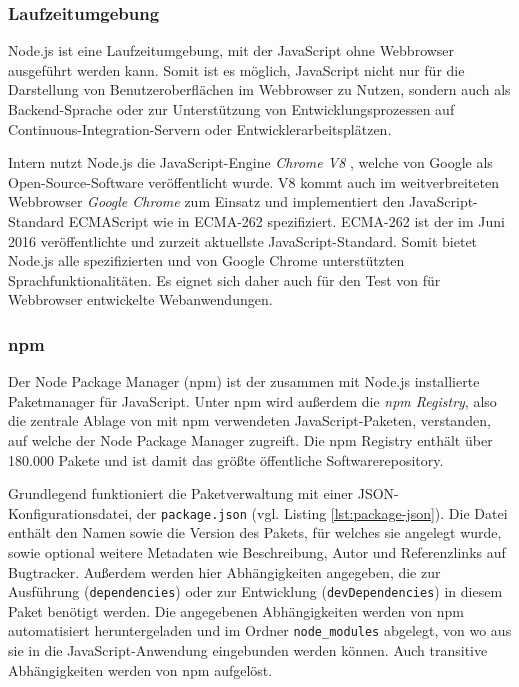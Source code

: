 \subsubsection{Laufzeitumgebung}
Node.js ist eine Laufzeitumgebung, mit der JavaScript ohne Webbrowser ausgeführt werden kann\cite[][1]{hughes2012einfuehrungnodejs}. Somit ist es möglich, JavaScript nicht nur für die Darstellung von Benutzeroberflächen im Webbrowser zu Nutzen, sondern auch als Backend-Sprache oder zur Unterstützung von Entwicklungsprozessen auf Continuous-Integration-Servern oder Entwicklerarbeitsplätzen.

Intern nutzt Node.js die JavaScript-Engine \textit{Chrome V8} \cite{nodejs}, welche von Google als Open-Source-Software veröffentlicht wurde. V8 kommt auch im weitverbreiteten Webbrowser \textit{Google Chrome} zum Einsatz und implementiert den JavaScript-Standard ECMAScript wie in ECMA-262 spezifiziert\cite{chromev8}. ECMA-262 ist der im Juni 2016 veröffentlichte und zurzeit aktuellste JavaScript-Standard\cite{ecma262}. Somit bietet Node.js alle spezifizierten und von Google Chrome unterstützten Sprachfunktionalitäten. Es eignet sich daher auch für den Test von für Webbrowser entwickelte Webanwendungen.

\subsubsection{npm}
Der Node Package Manager (npm) ist der zusammen mit Node.js installierte Paketmanager für JavaScript. Unter npm wird außerdem die \textit{npm Registry}, also die zentrale Ablage von mit npm verwendeten JavaScript-Paketen, verstanden, auf welche der Node Package Manager zugreift. \cite{npm-about} Die npm Registry enthält über 180.000 Pakete und ist damit das größte öffentliche Softwarerepository\cite{modulecount}.

Grundlegend funktioniert die Paketverwaltung mit einer JSON-Konfigurationsdatei, der \texttt{package.json} (vgl. Listing \ref{lst:package-json}). Die Datei enthält den Namen sowie die Version des Pakets, für welches sie angelegt wurde, sowie optional weitere Metadaten wie Beschreibung, Autor und Referenzlinks auf Bugtracker. Außerdem werden hier Abhängigkeiten angegeben, die zur Ausführung (\texttt{dependencies}) oder zur Entwicklung (\texttt{devDependencies}) in diesem Paket benötigt werden.\cite{npm-packagejson} Die angegebenen Abhängigkeiten werden von npm automatisiert heruntergeladen und im Ordner \texttt{node\_modules} abgelegt, von wo aus sie in die JavaScript-Anwendung eingebunden werden können. Auch transitive Abhängigkeiten werden von npm aufgelöst.\cite{npm-install}

